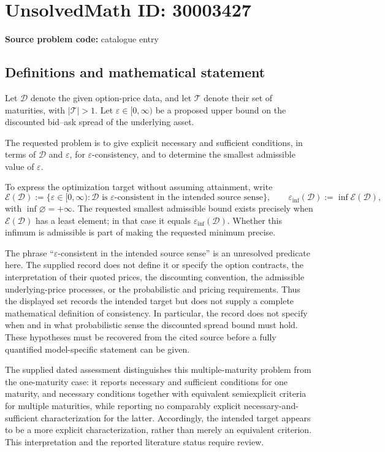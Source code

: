 \documentclass[11pt]{article}
\begin{document}
\section*{UnsolvedMath ID: 30003427}
\textbf{Source problem code:} catalogue entry
\subsection{Definitions and mathematical statement}
Let \(\mathcal D\) denote the given option-price data, and let \(\mathcal T\) denote their set of maturities, with \(|\mathcal T|>1\). Let \(\varepsilon\in[0,\infty)\) be a proposed upper bound on the discounted bid--ask spread of the underlying asset.

The requested problem is to give explicit necessary and sufficient conditions, in terms of \(\mathcal D\) and \(\varepsilon\), for \(\varepsilon\)-consistency, and to determine the smallest admissible value of \(\varepsilon\).

To express the optimization target without assuming attainment, write
\[
\mathcal E(\mathcal D)
:=\{\varepsilon\in[0,\infty):\mathcal D\text{ is }\varepsilon\text{-consistent in the intended source sense}\},
\qquad
\varepsilon_{\inf}(\mathcal D):=\inf\mathcal E(\mathcal D),
\]
with \(\inf\varnothing=+\infty\). The requested smallest admissible bound exists precisely when \(\mathcal E(\mathcal D)\) has a least element; in that case it equals \(\varepsilon_{\inf}(\mathcal D)\). Whether this infimum is admissible is part of making the requested minimum precise.

The phrase ``\(\varepsilon\)-consistent in the intended source sense'' is an unresolved predicate here. The supplied record does not define it or specify the option contracts, the interpretation of their quoted prices, the discounting convention, the admissible underlying-price processes, or the probabilistic and pricing requirements. Thus the displayed set records the intended target but does not supply a complete mathematical definition of consistency. In particular, the record does not specify when and in what probabilistic sense the discounted spread bound must hold. These hypotheses must be recovered from the cited source before a fully quantified model-specific statement can be given.

The supplied dated assessment distinguishes this multiple-maturity problem from the one-maturity case: it reports necessary and sufficient conditions for one maturity, and necessary conditions together with equivalent semiexplicit criteria for multiple maturities, while reporting no comparably explicit necessary-and-sufficient characterization for the latter. Accordingly, the intended target appears to be a more explicit characterization, rather than merely an equivalent criterion. This interpretation and the reported literature status require review.
\end{document}

